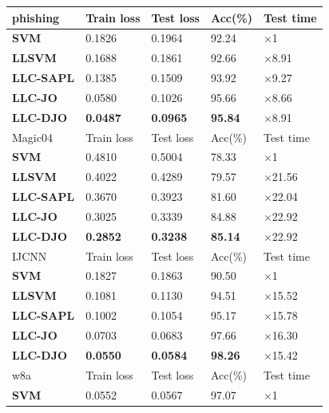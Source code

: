\documentclass{llncs}
\begin{document}
	\begin{table}
		\begin{tabu} to \textwidth {|X[c]| X[c]| X[c]| X[c]| X[c]|}
			\hline
			phishing              & Train loss & Test loss & Acc(\%) &Test time \\
			\hline
			\textbf{SVM} 		   	&0.1826 &0.1964  & 92.24  & $\times$1  \\ \hline
			\textbf{LLSVM}     		&0.1688  &0.1861  & 92.66  & $\times$8.91 \\ \hline
			\textbf{LLC-SAPL}       &0.1385 &0.1509  & 93.92  & $\times$9.27 \\ \hline
			\textbf{LLC-JO}         &0.0580  &0.1026  & 95.66  & $\times$8.66 \\ \hline
			\textbf{LLC-DJO}         &\textbf{0.0487}  &\textbf{0.0965}  & \textbf{95.84} &$\times$8.91 \\ \hline
			\hline
			Magic04              & Train loss & Test loss & Acc(\%) &Test time \\
			\hline
			\textbf{SVM} 		   	&0.4810 &0.5004  &78.33   &$\times$1 \\ \hline
			\textbf{LLSVM}     		&0.4022  &0.4289  &79.57   &$\times$21.56 \\ \hline
			\textbf{LLC-SAPL}       &0.3670  &0.3923  &81.60   &$\times$22.04 \\ \hline
			\textbf{LLC-JO}         &0.3025  &0.3339  &84.88  &$\times$22.92\\ \hline
			\textbf{LLC-DJO}         &\textbf{0.2852}  &\textbf{0.3238}  &\textbf{85.14}   &$\times$22.92\\ \hline
			\hline
			IJCNN              & Train loss & Test loss & Acc(\%) &Test time\\
			\hline
			\textbf{SVM} 		   	&0.1827 &0.1863  & 90.50   &$\times$1\\ \hline
			\textbf{LLSVM}     		&0.1081  &0.1130  & 94.51  &$\times$15.52\\ \hline
			\textbf{LLC-SAPL}       &0.1002  &0.1054  & 95.17   &$\times$15.78\\ \hline
			\textbf{LLC-JO}         &0.0703 &0.0683  & 97.66  &$\times$16.30\\ \hline
			\textbf{LLC-DJO}         &\textbf{0.0550}  &\textbf{0.0584}  &\textbf{98.26}   &$\times$15.42\\ \hline
			\hline
			w8a              & Train loss & Test loss & Acc(\%) &Test time\\
			\hline
			\textbf{SVM} 		   	&0.0552 &0.0567  & 97.07  &$\times$1\\ \hline

\end{tabu}
\end{table}
\end{document}
